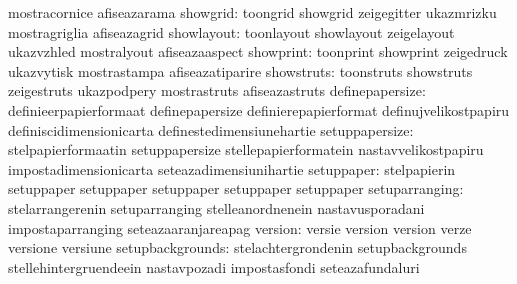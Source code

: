                                   mostracornice                    afiseazarama
                        showgrid: toongrid                         showgrid
                                  zeigegitter                      ukazmrizku
                                  mostragriglia                    afiseazagrid
                      showlayout: toonlayout                       showlayout
                                  zeigelayout                      ukazvzhled
                                  mostralyout                      afiseazaaspect
                       showprint: toonprint                        showprint
                                  zeigedruck                       ukazvytisk
                                  mostrastampa                     afiseazatiparire
                      showstruts: toonstruts                       showstruts
                                  zeigestruts                      ukazpodpery
                                  mostrastruts                     afiseazastruts
                 definepapersize: definieerpapierformaat           definepapersize
                                  definierepapierformat            definujvelikostpapiru
                                  definiscidimensionicarta         definestedimensiunehartie
                  setuppapersize: stelpapierformaatin              setuppapersize
                                  stellepapierformatein            nastavvelikostpapiru
                                  impostadimensionicarta           seteazadimensiunihartie
setuppaper: stelpapierin  setuppaper
            setuppaper    setuppaper
            setuppaper    setuppaper
                  setuparranging: stelarrangerenin                 setuparranging
                                  stelleanordnenein                nastavusporadani
                                  impostaparranging                seteazaaranjareapag
                         version: versie                           version
                                  version                          verze
                                  versione                         versiune
                setupbackgrounds: stelachtergrondenin              setupbackgrounds
                                  stellehintergruendeein           nastavpozadi
                                  impostasfondi                    seteazafundaluri
